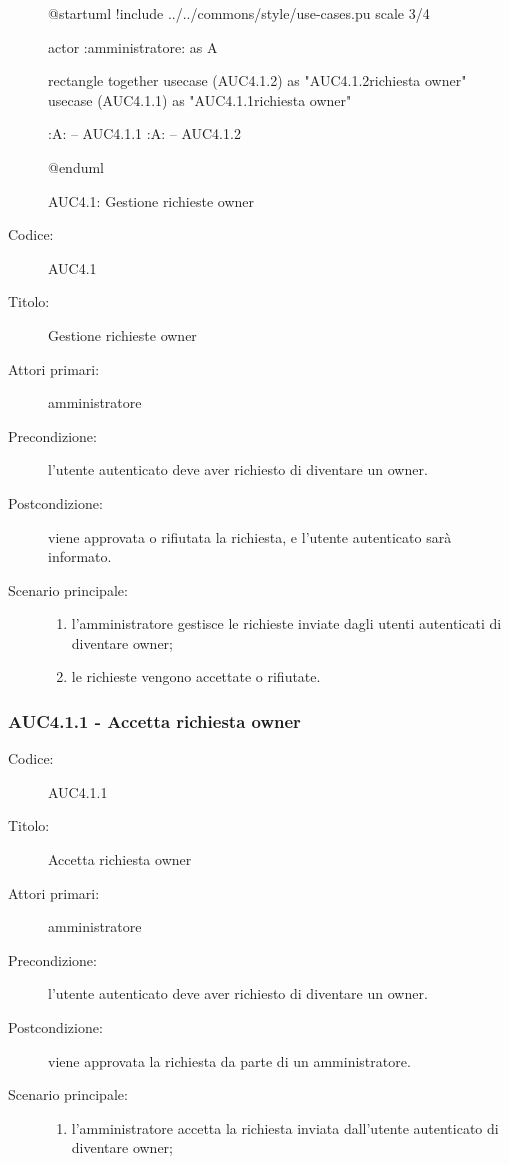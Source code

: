 \documentclass[casi-duso]{subfiles}
\begin{document}
\begin{figure}[h!]
  \centering
  \begin{plantuml}
  @startuml
  !include ../../commons/style/use-cases.pu
  scale 3/4

  actor :amministratore: as A

  rectangle {
    together {
      usecase (AUC4.1.2) as "AUC4.1.2\nRifiuta richiesta owner"
      usecase (AUC4.1.1) as "AUC4.1.1\nAccetta richiesta owner"
    }
  }

  :A: -- AUC4.1.1
  :A: -- AUC4.1.2

  @enduml
  \end{plantuml}
  \caption{AUC4.1: Gestione richieste owner}
  \label{fig:auc4_1}
\end{figure}

\begin{description}
  \item[Codice:] AUC4.1
  \item[Titolo:] Gestione richieste owner
  \item[Attori primari:] amministratore
  \item[Precondizione:] l'utente autenticato deve aver richiesto di diventare un owner.
  \item[Postcondizione:] viene approvata o rifiutata la richiesta, e l'utente autenticato sarà informato.
  \item[Scenario principale:]
  \begin{enumerate}
    \item l'amministratore gestisce le richieste inviate dagli utenti autenticati di diventare owner;
    \item le richieste vengono accettate o rifiutate.
  \end{enumerate}
\end{description}

\subsubsection{AUC4.1.1 - Accetta richiesta owner}%
\label{subsub:AUC4.1.1}
\begin{description}
  \item[Codice:] AUC4.1.1
  \item[Titolo:] Accetta richiesta owner
  \item[Attori primari:] amministratore
  \item[Precondizione:] l'utente autenticato deve aver richiesto di diventare un owner.
  \item[Postcondizione:] viene approvata la richiesta da parte di un amministratore.
  \item[Scenario principale:]
  \begin{enumerate}
    \item l'amministratore accetta la richiesta inviata dall'utente autenticato di diventare owner;
  \end{enumerate}
\end{description}
\end{document}
